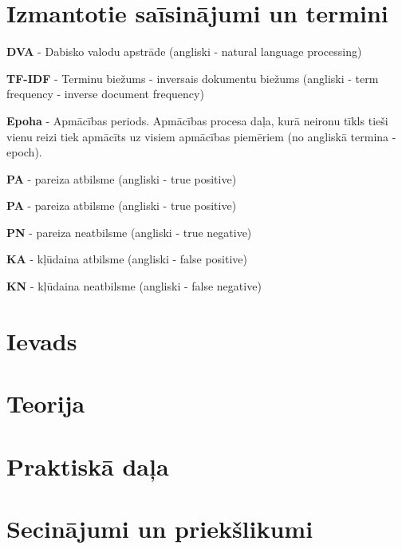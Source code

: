 \documentclass{VEA}
\begin{document}
\chapter*{Izmantotie saīsinājumi un termini}

\textbf{DVA} - Dabisko valodu apstrāde (angliski - natural language processing)

\textbf{TF-IDF} - Terminu biežums - inversais dokumentu biežums (angliski - term frequency - inverse document frequency)

\textbf{Epoha}  - Apmācības periods. Apmācības procesa daļa, kurā neironu tīkls tieši vienu reizi tiek apmācīts uz visiem apmācības piemēriem (no angliskā termina - epoch).

\textbf{PA} - pareiza atbilsme (angliski - true positive)

\textbf{PA} - pareiza atbilsme (angliski - true positive)

\textbf{PN} - pareiza neatbilsme (angliski - true negative)

\textbf{KA} - kļūdaina atbilsme (angliski - false positive)

\textbf{KN} - kļūdaina neatbilsme (angliski - false negative)

\chapter*{Ievads} %



\chapter{Teorija}


\chapter{Praktiskā daļa}



\chapter*{Secinājumi un priekšlikumi}

\end{document}
